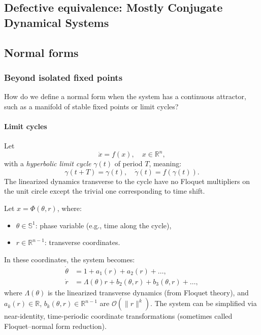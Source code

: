 \documentclass{article}
\theoremstyle{definition} \newtheorem{definition}{Definition}  \newtheorem{example}{Example}
\theoremstyle{remark} \newtheorem{remark}{Remark}
\newcounter{ct}
\begin{document}
\subsection{Defective equivalence: Mostly Conjugate Dynamical Systems}
\citep{skufca2007relaxing, skufca2008mostlyconjugate, bollt2010comparing}



\subsection{Normal forms}



\subsubsection{Beyond isolated fixed points}
How do we define a normal form when the system has a continuous attractor, such as a manifold of stable fixed points or limit cycles?
\paragraph{Limit cycles}%
Let 
\[
\dot{x} = f(x), \quad x \in \mathbb{R}^n,
\]
with a \emph{hyperbolic limit cycle} \( \gamma(t) \) of period \( T \), meaning:
\[
\gamma(t + T) = \gamma(t), \quad \dot{\gamma}(t) = f(\gamma(t)).
\]
The linearized dynamics transverse to the cycle have no Floquet multipliers on the unit circle except the trivial one corresponding to time shift.

Let \( x = \Phi(\theta, r) \), where: %
\begin{itemize}
  \item \( \theta \in \mathbb{S}^1 \): phase variable (e.g., time along the cycle),
  \item \( r \in \mathbb{R}^{n-1} \): transverse coordinates.
\end{itemize}
In these coordinates, the system becomes:
\[
\begin{aligned}
\dot{\theta} &= 1 + a_1(r) + a_2(r) + \dots, \\
\dot{r} &= \Lambda(\theta) r + b_2(\theta, r) + b_3(\theta, r) + \dots,
\end{aligned}
\]
where \( \Lambda(\theta) \) is the linearized transverse dynamics (from Floquet theory),
and  \( a_k(r) \in \mathbb{R} \), \( b_k(\theta, r) \in \mathbb{R}^{n-1} \) are \( \mathcal{O}(\|r\|^k) \).
The system can be simplified via near-identity, time-periodic coordinate transformations (sometimes called Floquet–normal form reduction).
\end{document}

